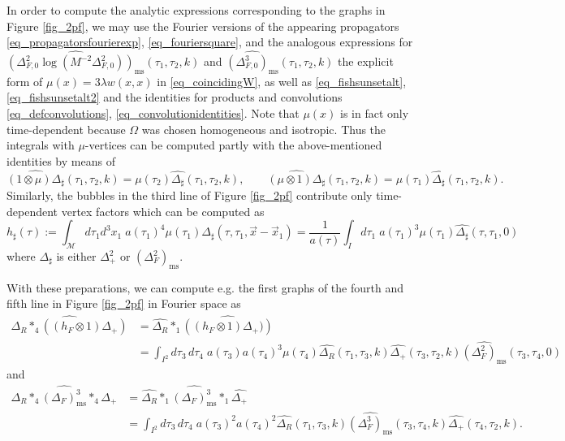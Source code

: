 \documentclass[a4paper,10pt,twoside]{article}
\numberwithin{equation}{section}
\newcounter{and}
\def\M{\mathcal{M}}
\def\ms{\mathrm{ms}}
\theoremstyle{plain}
\theoremstyle{definition}
\begin{document}
In order to compute the analytic expressions corresponding to the graphs in Figure \ref{fig_2pf}, we may use the Fourier versions of the appearing propagators \eqref{eq_propagatorsfourierexp}, \eqref{eq_fouriersquare}, and the analogous expressions for $\widehat{\left(\Delta^2_{F,0}\log\left(M^{-2}\Delta^2_{F,0}\right) \right)_\text{ms}}(\tau_1,\tau_2,k)$ and 
$\widehat{\left(\Delta^3_{F,0}\right)_\text{ms}}(\tau_1,\tau_2,k)$ the explicit form of $\mu(x)=3\lambda w(x,x)$ in \eqref{eq_coincidingW}, as well as \eqref{eq_fishsunsetalt}, \eqref{eq_fishsunsetalt2} and the identities for products and convolutions \eqref{eq_defconvolutions}, \eqref{eq_convolutionidentities}. Note that $\mu(x)$ is in fact only time-dependent because $\Omega$ was chosen homogeneous and isotropic. Thus the integrals with $\mu$-vertices can be computed partly with the above-mentioned identities by means of 
$$\widehat{(1\otimes \mu) \Delta_{\sharp}}(\tau_1,\tau_2,k)=\mu(\tau_2)\widehat{\Delta_{\sharp}}(\tau_1,\tau_2,k),\qquad\widehat{(\mu\otimes 1) \Delta_{\sharp}}(\tau_1,\tau_2,k)=\mu(\tau_1)\widehat{\Delta_{\sharp}}(\tau_1,\tau_2,k).$$
Similarly, the bubbles in the third line of Figure \ref{fig_2pf} contribute only time-dependent vertex factors which can be computed as 
$$h_\sharp(\tau):=\int_\M d\tau_1 d^3x_1\; a(\tau_1)^4\mu(\tau_1)\Delta_\sharp(\tau,\tau_1,\vec{x}-\vec{x}_1)=\frac{1}{a(\tau)}\int_I d\tau_1\;a(\tau_1)^3 \mu(\tau_1)\widehat{\Delta_\sharp}(\tau,\tau_1,0)$$
where $\Delta_\sharp$ is either $\Delta^2_+$ or $\left(\Delta^2_F\right)_\ms$.

With these preparations, we can compute e.g. the first graphs of the fourth and fifth line in Figure \ref{fig_2pf} 
in Fourier space as
\begin{align*}
\widehat{\Delta_R\ast_4((h_F\otimes 1)\Delta_+)}&=\widehat{\Delta_R}\ast_1\widehat{\left((h_F\otimes 1)\Delta_+)\right)}\\
&=\int_{I^2} d\tau_3\,d\tau_4\; a(\tau_3)a(\tau_4)^3\mu(\tau_4)\widehat{\Delta_R}(\tau_1,\tau_3,k)\widehat{\Delta_+}(\tau_3,\tau_2,k)\widehat{(\Delta^2_F)_\text{ms}}(\tau_3,\tau_4,0)
\end{align*}
and
\begin{align*}
\widehat{\Delta_R\ast_4(\Delta_F)^3_\text{ms}\ast_4\Delta_+}&=\widehat{\Delta_R}\ast_1\widehat{(\Delta_F)^3_\text{ms}}\ast_1\widehat{\Delta_+}\\
&=\int_{I^2} d\tau_3\,d\tau_4\; a(\tau_3)^2a(\tau_4)^2\widehat{\Delta_R}(\tau_1,\tau_3,k)\widehat{(\Delta^3_F)_\text{ms}}(\tau_3,\tau_4,k)\widehat{\Delta_+}(\tau_4,\tau_2,k).
\end{align*}
\end{document}
